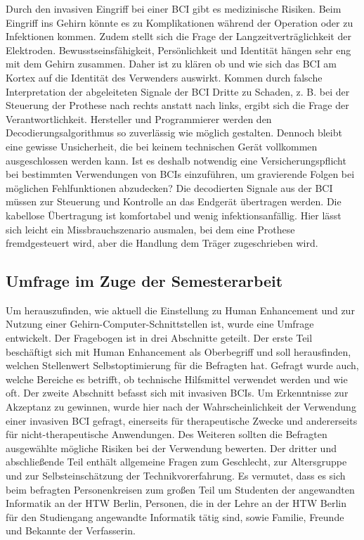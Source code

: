 \documentclass[11pt,ngerman,parskip=half]{scrartcl}
\begin{document}
Durch den invasiven Eingriff bei einer BCI gibt es medizinische Risiken. Beim
Eingriff ins Gehirn könnte es zu Komplikationen während der Operation oder zu
Infektionen kommen. Zudem stellt sich die Frage der Langzeitverträglichkeit
der Elektroden. \parencite[][28]{clausen_ethische_2006}
Bewusstseinsfähigkeit, Persönlichkeit und Identität hängen sehr eng mit dem
Gehirn zusammen. Daher ist zu klären ob und wie sich das BCI am Kortex auf
die Identität des Verwenders auswirkt.
\parencite[][28]{clausen_ethische_2006} Kommen durch falsche Interpretation
der abgeleiteten Signale der BCI Dritte zu Schaden, z. B. bei der Steuerung
der Prothese nach rechts anstatt nach links, ergibt sich die Frage der
Verantwortlichkeit. Hersteller und Programmierer werden den
Decodierungsalgorithmus so zuverlässig wie möglich gestalten. Dennoch bleibt
eine gewisse Unsicherheit, die bei keinem technischen Gerät vollkommen
ausgeschlossen werden kann. Ist es deshalb notwendig eine
Versicherungspflicht bei bestimmten Verwendungen von BCIs einzuführen, um
gravierende Folgen bei möglichen Fehlfunktionen abzudecken?
\parencite[][29]{clausen_ethische_2006} Die decodierten Signale aus der BCI
müssen zur Steuerung und Kontrolle an das Endgerät übertragen werden. Die
kabellose Übertragung ist komfortabel und wenig infektionsanfällig. Hier
lässt sich leicht ein Missbrauchszenario ausmalen, bei dem eine Prothese
fremdgesteuert wird, aber die Handlung dem Träger zugeschrieben wird.
\parencite[][30]{clausen_ethische_2006}

\subsection{Umfrage im Zuge der Semesterarbeit}
\label{subsec:kathrin_umfrage_im_zuge_der_semesterarbeit}
Um herauszufinden, wie aktuell die Einstellung zu Human Enhancement und zur
Nutzung einer Gehirn-Computer-Schnittstellen ist, wurde eine Umfrage
entwickelt. Der Fragebogen ist in drei Abschnitte geteilt. Der erste Teil
beschäftigt sich mit Human Enhancement als Oberbegriff und soll herausfinden,
welchen Stellenwert Selbstoptimierung für die Befragten hat. Gefragt wurde
auch, welche Bereiche es betrifft, ob technische Hilfsmittel verwendet werden
und wie oft. Der zweite Abschnitt befasst sich mit invasiven BCIs. Um
Erkenntnisse zur Akzeptanz zu gewinnen, wurde hier nach der
Wahrscheinlichkeit der Verwendung einer invasiven BCI gefragt, einerseits für
therapeutische Zwecke und andererseits für nicht-therapeutische Anwendungen.
Des Weiteren sollten die Befragten ausgewählte mögliche Risiken bei der
Verwendung bewerten. Der dritter und abschließende Teil enthält allgemeine
Fragen zum Geschlecht, zur Altersgruppe und zur Selbsteinschätzung der
Technikvorerfahrung. Es vermutet, dass es sich beim befragten Personenkreisen
zum großen Teil um Studenten der angewandten Informatik an der HTW Berlin,
Personen, die in der Lehre an der HTW Berlin für den Studiengang angewandte
Informatik tätig sind, sowie Familie, Freunde und Bekannte der Verfasserin.
\end{document}
